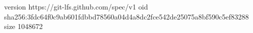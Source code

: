 version https://git-lfs.github.com/spec/v1
oid sha256:3fdc64f0c9ab601fdbbd78560a04d4a8dc2fce542de25075a8bf590c5ef83288
size 1048672

